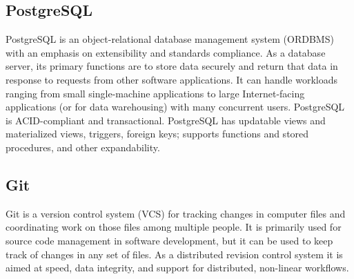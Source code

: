 \subsection{PostgreSQL}
PostgreSQL is an object-relational database management system (ORDBMS) with an emphasis on extensibility and standards compliance. As a database server, its primary functions are to store data securely and return that data in response to requests from other software applications. It can handle workloads ranging from small single-machine applications to large Internet-facing applications (or for data warehousing) with many concurrent users. PostgreSQL is ACID-compliant and transactional. PostgreSQL has updatable views and materialized views, triggers, foreign keys; supports functions and stored procedures, and other expandability.

\subsection{Git}
Git is a version control system (VCS) for tracking changes in computer files and coordinating work on those files among multiple people. It is primarily used for source code management in software development, but it can be used to keep track of changes in any set of files. As a distributed revision control system it is aimed at speed, data integrity, and support for distributed, non-linear workflows.
